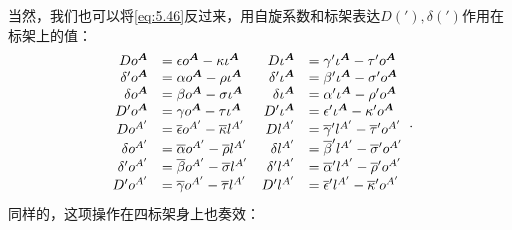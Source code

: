 当然，我们也可以将\ref{eq:5.46}反过来，用自旋系数和标架表达$D( ') ,\delta ( ')$作用在标架上的值：
\begin{equation*}
	\begin{array}{ r l r l }
		Do^{\boldsymbol{A}} & =\epsilon o^{\boldsymbol{A}} -\kappa \iota ^{\boldsymbol{A}} & D\iota ^{\boldsymbol{A}} & =\gamma '\iota ^{\boldsymbol{A}} -\tau 'o^{\boldsymbol{A}}\\
		\delta 'o^{\boldsymbol{A}} & =\alpha o^{\boldsymbol{A}} -\rho \iota ^{\boldsymbol{A}} & \delta '\iota ^{\boldsymbol{A}} & =\beta '\iota ^{\boldsymbol{A}} -\sigma 'o^{\boldsymbol{A}}\\
		\delta o^{\boldsymbol{A}} & =\beta o^{\boldsymbol{A}} -\sigma \iota ^{\boldsymbol{A}} & \delta \iota ^{\boldsymbol{A}} & =\alpha '\iota ^{\boldsymbol{A}} -\rho 'o^{\boldsymbol{A}}\\
		D'o^{\boldsymbol{A}} & =\gamma o^{\boldsymbol{A}} -\tau \iota ^{\boldsymbol{A}} & D'\iota ^{\boldsymbol{A}} & =\epsilon '\iota ^{\boldsymbol{A}} -\kappa 'o^{\boldsymbol{A}}\\
		Do^{A'} & =\overline{\epsilon } o^{A'} -\overline{\kappa } l^{A'} & Dl^{A'} & =\overline{\gamma } 'l^{A'} -\overline{\tau } 'o^{A'}\\
		\delta o^{A'} & =\overline{\alpha } o^{A'} -\overline{\rho } l^{A'} & \delta l^{A'} & =\overline{\beta } 'l^{A'} -\overline{\sigma } 'o^{A'}\\
		\delta 'o^{A'} & =\overline{\beta } o^{A'} -\overline{\sigma } l^{A'} & \delta 'l^{A'} & =\overline{\alpha } 'l^{A'} -\overline{\rho } 'o^{A'}\\
		D'o^{A'} & =\overline{\gamma } o^{A'} -\overline{\tau } l^{A'} & D'l^{A'} & =\overline{\epsilon } 'l^{A'} -\overline{\kappa } 'o^{A'}
	\end{array} .
\end{equation*}
同样的，这项操作在四标架身上也奏效：
